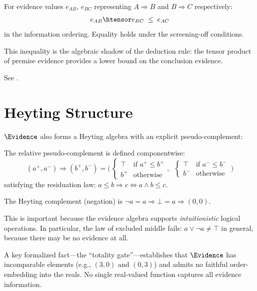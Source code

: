 \documentclass[11pt,openany]{report}
\begin{document}
\begin{theorem}
\label{thm:quantale-trans}
For evidence values $e_{AB}$, $e_{BC}$ representing
$A \Rightarrow B$ and $B \Rightarrow C$ respectively:
\[
  e_{AB} \htensor e_{BC} \;\le\; e_{AC}
\]
in the information ordering.  Equality holds under the screening-off
conditions.
\end{theorem}

This inequality is the algebraic shadow of the deduction rule:
the tensor product of premise evidence provides a lower bound on the
conclusion evidence.

See .

\section{Heyting Structure}

$\Evidence$ also forms a Heyting algebra with an explicit
pseudo-complement:

\begin{definition}
The relative pseudo-complement is defined componentwise:
\[
  (a^+, a^-) \Rightarrow (b^+, b^-) =
  \Big(\,\begin{cases} \top & \text{if } a^+ \le b^+ \\
                        b^+ & \text{otherwise}\end{cases},\;\;
        \begin{cases} \top & \text{if } a^- \le b^- \\
                        b^- & \text{otherwise}\end{cases}\,\Big)
\]
satisfying the residuation law:
$a \le b \Rightarrow c \iff a \wedge b \le c$.
\end{definition}

The Heyting complement (negation) is $\neg a = a \Rightarrow \bot = a \Rightarrow (0,0)$.

This is important because the evidence algebra supports \emph{intuitionistic}
logical operations.  In particular, the law of excluded middle fails:
$a \vee \neg a \ne \top$ in general, because there may be no evidence at all.

A key formalized fact---the ``totality gate''---establishes that
$\Evidence$ has incomparable elements (e.g., $(3, 0)$ and $(0, 3)$) and
admits no faithful order-embedding into the reals.  No single real-valued
function captures all evidence information.
\end{document}
